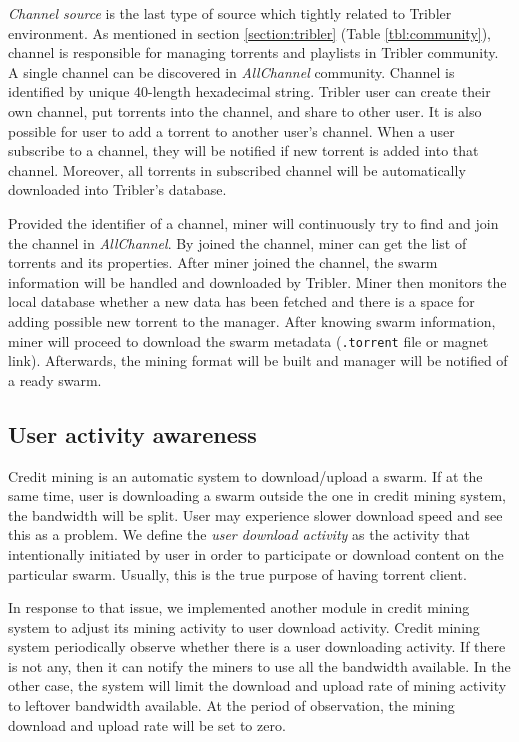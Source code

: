 \textit{Channel source} is the last type of source which tightly related to Tribler environment. As mentioned in section \ref{section:tribler} (Table \ref{tbl:community}), channel is responsible for managing torrents and playlists in Tribler community. A single channel can be discovered in \textit{AllChannel} community. Channel is identified by unique 40-length hexadecimal string. Tribler user can create their own channel, put torrents into the channel, and share to other user. It is also possible for user to add a torrent to another user's channel. When a user subscribe to a channel, they will be notified if new torrent is added into that channel. Moreover, all torrents in subscribed channel will be automatically downloaded into Tribler's database.

Provided the identifier of a channel, miner will continuously try to find and join the channel in \textit{AllChannel}. By joined the channel, miner can get the list of torrents and its properties. After miner joined the channel, the swarm information will be handled and downloaded by Tribler. Miner then monitors the local database whether a new data has been fetched and there is a space for adding possible new torrent to the manager. After knowing swarm information, miner will proceed to download the swarm metadata (\texttt{.torrent} file or magnet link). Afterwards, the mining format will be built and manager will be notified of a ready swarm.

\subsection{User activity awareness}
\label{section:uactivityimpl}
Credit mining is an automatic system to download/upload a swarm. If at the same time, user is downloading a swarm outside the one in credit mining system, the bandwidth will be split. User may experience slower download speed and see this as a problem. We define the \textit{user download activity} as the activity that intentionally initiated by user in order to participate or download content on the particular swarm. Usually, this is the true purpose of having torrent client. 

In response to that issue, we implemented another module in credit mining system to adjust its mining activity to user download activity. Credit mining system periodically observe whether there is a user downloading activity. If there is not any, then it can notify the miners to use all the bandwidth available. In the other case, the system will limit the download and upload rate of mining activity to leftover bandwidth available. At the period of observation, the mining download and upload rate will be set to zero.


